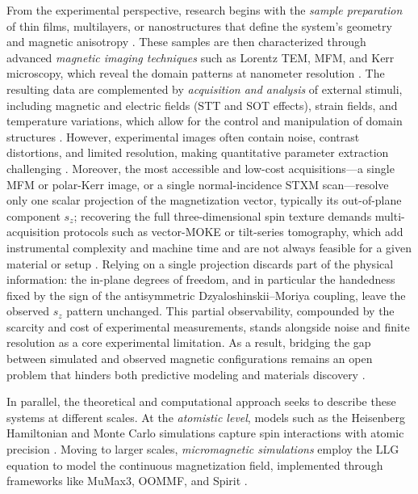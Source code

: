 \documentclass[letterpaper, 12, one column]{article}
\begin{document}
From the experimental perspective, research begins with the \textit{sample preparation} of thin films, multilayers, or nanostructures that define the system's geometry and magnetic anisotropy \cite{Fert2022ThinFilms}. These samples are then characterized through advanced \textit{magnetic imaging techniques} such as Lorentz TEM, MFM, and Kerr microscopy, which reveal the domain patterns at nanometer resolution \cite{Li2023Magnetic}. The resulting data are complemented by \textit{acquisition and analysis} of external stimuli, including magnetic and electric fields (STT and SOT effects), strain fields, and temperature variations, which allow for the control and manipulation of domain structures \cite{Shao2021SOT}. However, experimental images often contain noise, contrast distortions, and limited resolution, making quantitative parameter extraction challenging \cite{Nistico2020Magnetic}. Moreover, the most accessible and low-cost acquisitions—a single MFM or polar-Kerr image, or a single normal-incidence STXM scan—resolve only one scalar projection of the magnetization vector, typically its out-of-plane component $s_z$; recovering the full three-dimensional spin texture demands multi-acquisition protocols such as vector-MOKE or tilt-series tomography, which add instrumental complexity and machine time and are not always feasible for a given material or setup \cite{Li2023Magnetic}. Relying on a single projection discards part of the physical information: the in-plane degrees of freedom, and in particular the handedness fixed by the sign of the antisymmetric Dzyaloshinskii–Moriya coupling, leave the observed $s_z$ pattern unchanged. This partial observability, compounded by the scarcity and cost of experimental measurements, stands alongside noise and finite resolution as a core experimental limitation. As a result, bridging the gap between simulated and observed magnetic configurations remains an open problem that hinders both predictive modeling and materials discovery \cite{Raviolo2020Angular}.


In parallel, the theoretical and computational approach seeks to describe these systems at different scales. At the \textit{atomistic level}, models such as the Heisenberg Hamiltonian and Monte Carlo simulations capture spin interactions with atomic precision \cite{Chrobak2020Atomic}. Moving to larger scales, \textit{micromagnetic simulations} employ the LLG equation to model the continuous magnetization field, implemented through frameworks like MuMax3, OOMMF, and Spirit \cite{Li2023Magnetic}.
\end{document}
